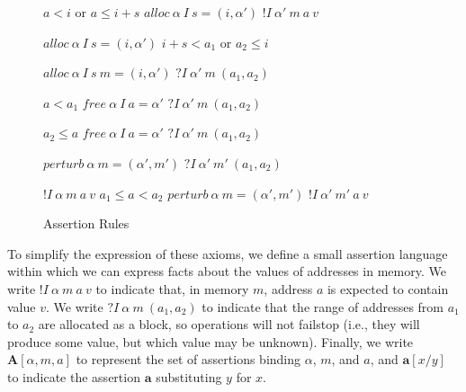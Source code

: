 \documentclass{article}
\begin{document}
\begin{figure}
  \begin{minipage}{0.33\textwidth}
                      {\(a < i\) or \(a \leq i+s\)}
                      {\(\mathit{alloc} ~ \alpha ~ I ~ s = (i, \alpha')\)}
                      {\(! I ~ \alpha' ~ m ~ a ~ v\)}
  \end{minipage}
  \begin{minipage}{0.33\textwidth}
               {\(\mathit{alloc} ~ \alpha ~ I ~ s = (i, \alpha')\)}
               {\(i+s < a_1\) or \(a_2 \leq i\)}
  \end{minipage}
  \begin{minipage}{0.33\textwidth}
               {\(\mathit{alloc} ~ \alpha ~ I ~ s ~ m = (i, \alpha')\)}
               {\(? I ~ \alpha' ~ m ~ (a_1,a_2)\)}
  \end{minipage}
  \begin{minipage}{0.33\textwidth}
                      {\(a < a_1\)}
                      {\(\mathit{free} ~ \alpha ~ I ~ a = \alpha'\)}
                      {\(? I ~ \alpha' ~ m ~ (a_1,a_2)\)}
  \end{minipage}
  \begin{minipage}{0.33\textwidth}
                      {\(a_2 \leq a\)}
                      {\(\mathit{free} ~ \alpha ~ I ~ a = \alpha'\)}
                      {\(? I ~ \alpha' ~ m ~ (a_1,a_2)\)}
  \end{minipage}
  \begin{minipage}{0.33\textwidth}
               {\(\mathit{perturb} ~ \alpha ~ m = (\alpha', m')\)}
               {\(? I ~ \alpha' ~ m' ~ (a_1,a_2)\)}
  \end{minipage}
  \begin{minipage}{0.33\textwidth}
                        {\(! I ~ \alpha ~ m ~ a ~ v\)}
                        {\(a_1 \leq a < a_2\)}
                        {\(\mathit{perturb} ~ \alpha ~ m = (\alpha', m')\)}
                        {\(! I ~ \alpha' ~ m' ~ a ~ v\)}
  \end{minipage}

  \caption{Assertion Rules}
  \label{fig:asserts}
\end{figure}

To simplify the expression of these axioms, we define a small assertion language within
which we can express facts about the values of addresses in memory. We write
\(! I ~ \alpha ~ m ~ a ~ v\) to indicate that, in memory \(m\), address \(a\) is expected
to contain value \(v\). We write \(? I ~ \alpha ~ m ~ (a_1,a_2)\) to indicate that the range
of addresses from \(a_1\) to \(a_2\) are allocated as a block, so operations will not failstop
(i.e., they will produce some value, but which value may be unknown).
Finally, we write \(\mathbf{A}[\alpha,m,a]\) to represent the set of assertions binding \(\alpha\),
\(m\), and \(a\), and \(\mathbf{a}[x/y]\) to indicate the assertion \(\mathbf{a}\) substituting
\(y\) for \(x\).
\end{document}
